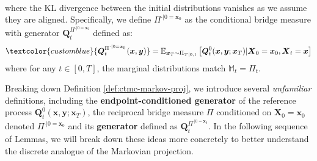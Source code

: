 \documentclass{article}
\newcommand{\bluetext}[1]{\textcolor{customblue}{#1}}
\begin{document}
\begin{definition}
\begin{align}
    \end{align}
    where the KL divergence between the initial distributions vanishes as we assume they are aligned. Specifically, we define $\Pi^{\cdot|0=\boldsymbol{x}_0}$ as the conditional bridge measure with generator $\boldsymbol{Q}^{\Pi^{\cdot|0=\boldsymbol{x}_0}}_t$ defined as:
    \begin{align}
        \bluetext{\boldsymbol{Q}^{\Pi^{\cdot|0=\boldsymbol{x}_0}}_t(\boldsymbol{x}, \boldsymbol{y})}=\mathbb{E}_{\boldsymbol{x}_T\sim \Pi_{T|0,t}}\left[\boldsymbol{Q}^0_t(\boldsymbol{x},\boldsymbol{y}; \boldsymbol{x}_T)|\boldsymbol{X}_0=\boldsymbol{x}_0, \boldsymbol{X}_t=\boldsymbol{x}\right]
    \end{align}
    where for any $t\in [0,T]$, the marginal distributions match $\mathbb{M}_t=\Pi_t$.
\end{definition}

Breaking down Definition \ref{def:ctmc-markov-proj}, we introduce several \textit{unfamiliar} definitions, including the \textbf{endpoint-conditioned generator} of the reference process $\boldsymbol{Q}^0_t(\boldsymbol{x},\boldsymbol{y}; \boldsymbol{x}_T)$, the reciprocal bridge measure $\Pi$ conditioned on $\boldsymbol{X}_0=\boldsymbol{x}_0$ denoted $\Pi^{\cdot|0=\boldsymbol{x}_0}$ and its \textbf{generator} defined as $\boldsymbol{Q}^{\Pi^{\cdot|0=\boldsymbol{x}_0}}_t$. In the following sequence of Lemmas, we will break down these ideas more concretely to better understand the discrete analogue of the Markovian projection.
\end{document}
